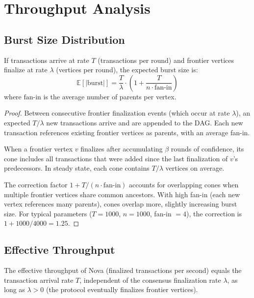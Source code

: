 \section{Throughput Analysis}

\label{sec:nova-throughput}

\subsection{Burst Size Distribution}

\begin{theorem}
\label{thm:nova-burst-size}
If transactions arrive at rate $T$ (transactions per round) and frontier vertices
finalize at rate $\lambda$ (vertices per round), the expected burst size is:
\[
\mathbb{E}[|\text{burst}|] = \frac{T}{\lambda} \cdot \left(1 + \frac{T}{n \cdot \text{fan-in}}\right)
\]
where $\text{fan-in}$ is the average number of parents per vertex.
\end{theorem}

\begin{proof}
Between consecutive frontier finalization events (which occur at rate $\lambda$), an
expected $T/\lambda$ new transactions arrive and are appended to the DAG. Each new
transaction references existing frontier vertices as parents, with an average fan-in.

When a frontier vertex $v$ finalizes after accumulating $\beta$ rounds of confidence,
its cone includes all transactions that were added since the last finalization of $v$'s
predecessors. In steady state, each cone contains $T/\lambda$ vertices on average.

The correction factor $1 + T/(n \cdot \text{fan-in})$ accounts for overlapping cones
when multiple frontier vertices share common ancestors. With high fan-in (each new
vertex references many parents), cones overlap more, slightly increasing burst size.
For typical parameters ($T = 1000$, $n = 1000$, fan-in $= 4$), the correction is
$1 + 1000/4000 = 1.25$.
\end{proof}

\subsection{Effective Throughput}

\begin{corollary}
\label{cor:throughput}
The effective throughput of Nova (finalized transactions per second) equals the
transaction arrival rate $T$, independent of the consensus finalization rate $\lambda$,
as long as $\lambda > 0$ (the protocol eventually finalizes frontier vertices).
\end{corollary}

